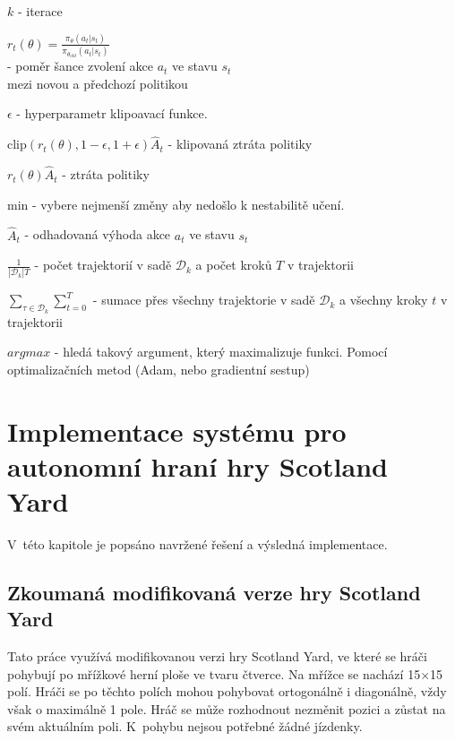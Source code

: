   \begin{myitemize}
    \item $k$ - iterace
    \item $r_t(\theta) = \frac{\pi_\theta(a_t|s_t)}{\pi_{\theta_{old}}(a_t|s_t)}$\\ - poměr šance zvolení akce $a_t$ ve stavu $s_t$ \\ mezi novou a předchozí politikou
    \item $\epsilon$ - hyperparametr klipoavací funkce.
    \item $\text{clip}(r_t(\theta), 1-\epsilon, 1+\epsilon) \hat{A}_t$ - klipovaná ztráta politiky
    \item $r_t(\theta) \hat{A}_t$ - ztráta politiky
    \item min -  vybere nejmenší změny aby nedošlo k nestabilitě učení.
    \item $\hat{A}_t$ - odhadovaná výhoda akce $a_t$ ve stavu $s_t$
    \item $\frac{1}{\left|\mathcal{D}_k\right|T}$ - počet trajektorií v sadě $\mathcal{D}_k$ a počet kroků $T$ v trajektorii
    \item $\displaystyle\sum_{\tau \in \mathcal{D}_k} \sum_{t=0}^T$ - sumace přes všechny trajektorie v sadě $\mathcal{D}_k$ a všechny kroky $t$ v trajektorii
    \item $argmax$ - hledá takový argument, který maximalizuje funkci.
    Pomocí optimalizačních metod (Adam, nebo gradientní sestup)
\end{myitemize}



\chapter{Implementace systému pro autonomní hraní hry Scotland Yard}
\label{ch:navrh}
V~této kapitole je popsáno navržené řešení a výsledná implementace.
\section{Zkoumaná modifikovaná verze hry Scotland Yard}\label{sec:zkoumana-modifikovana-verze-hry-scotland-yard}

Tato práce využívá modifikovanou verzi hry Scotland Yard, ve které se hráči pohybují po mřížkové herní ploše ve tvaru čtverce.
Na mřížce se nachází 15$\times$15 polí.
Hráči se po těchto polích mohou pohybovat ortogonálně i diagonálně, vždy však o maximálně 1 pole.
Hráč se může rozhodnout nezměnit pozici a zůstat na svém aktuálním poli.
K~pohybu nejsou potřebné žádné jízdenky.


